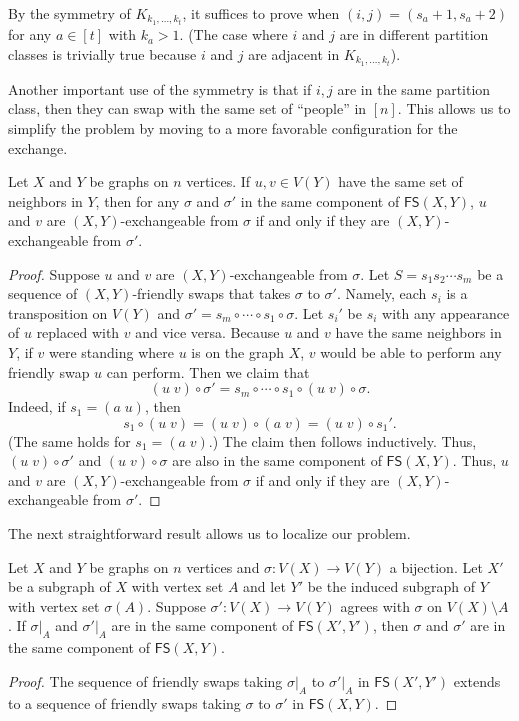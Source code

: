 \documentclass{mystyle}
\newcommand{\FS}{\mathsf{FS}}
\begin{document}
By the symmetry of $K_{k_1, \ldots, k_t}$, it suffices to prove  when $(i, j) = (s_a + 1, s_a + 2)$ for any $a \in [t]$ with $k_a > 1$. (The case where $i$ and $j$ are in different partition classes is trivially true because $i$ and $j$ are adjacent in $K_{k_1, \ldots, k_t}$). 

Another important use of the symmetry is that if $i,j$ are in the same partition class, then they can swap with the same set of ``people'' in $[n]$. This allows us to simplify the problem by moving to a more favorable configuration for the exchange. 
\begin{lemma}\label{lem_u_v_equivalent}
    Let $X$ and $Y$ be graphs on $n$ vertices. If $u, v \in V(Y)$ have the same set of neighbors in $Y$, then for any $\sigma$ and $\sigma'$ in the same component of $\FS(X, Y)$, $u$ and $v$ are $(X, Y)$-exchangeable from $\sigma$ if and only if they are $(X, Y)$-exchangeable from $\sigma'$. 
\end{lemma}
\begin{proof}
    Suppose $u$ and $v$ are $(X, Y)$-exchangeable from $\sigma$. Let $S = s_1 s_2 \cdots s_m$ be a sequence of $(X, Y)$-friendly swaps that takes $\sigma$ to $\sigma'$. Namely, each $s_i$ is a transposition on $V(Y)$ and $\sigma' = s_m \circ \cdots \circ s_1 \circ \sigma$. Let $s_i'$ be $s_i$ with any appearance of $u$ replaced with $v$ and vice versa. Because $u$ and $v$ have the same neighbors in $Y$, if $v$ were standing where $u$ is on the graph $X$, $v$ would be able to perform any friendly swap $u$ can perform. Then we claim that 
    \[
    (u \; v) \circ \sigma' = s_m \circ \cdots \circ s_1 \circ (u \; v) \circ \sigma.
    \]
    Indeed, if $s_1 = (a \; u)$, then 
    \[
    s_1 \circ (u \; v) = (u \; v) \circ (a \; v) = (u \; v) \circ s_1'.
    \]
    (The same holds for $s_1 = (a \; v)$.) The claim then follows inductively. Thus, $(u \; v) \circ \sigma'$ and $(u \; v) \circ \sigma$ are also in the same component of $\FS(X, Y)$. Thus, $u$ and $v$ are $(X, Y)$-exchangeable from $\sigma$ if and only if they are $(X, Y)$-exchangeable from $\sigma'$.
\end{proof}
The next straightforward result allows us to localize our problem.
\begin{lemma}\label{lem_localization}
    Let $X$ and $Y$ be graphs on $n$ vertices and $\sigma: V(X) \to V(Y)$ a bijection. Let $X'$ be a subgraph of $X$ with vertex set $A$ and let $Y'$ be the induced subgraph of $Y$ with vertex set $\sigma(A)$. Suppose $\sigma': V(X) \to V(Y)$ agrees with $\sigma$ on $V(X) \setminus A$. If $\sigma|_A$ and $\sigma'|_A$ are in the same component of $\FS(X', Y')$, then $\sigma$ and $\sigma'$ are in the same component of $\FS(X, Y)$.
\end{lemma}
\begin{proof}
    The sequence of friendly swaps taking $\sigma|_A$ to $\sigma'|_A$ in $\FS(X', Y')$ extends to a sequence of friendly swaps taking $\sigma$ to $\sigma'$ in $\FS(X, Y)$.
\end{proof}
\end{document}
